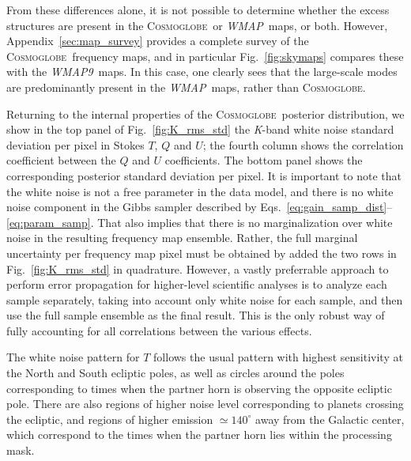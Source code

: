 \documentclass[twocolumn]{../../common/aa}
\def\WMAP{\emph{WMAP}}
\def\WMAPnine{\emph{WMAP9}}
\newcommand{\cosmoglobe}{\textsc{Cosmoglobe}}
\newcommand{\K}[0]{\textit K}
\begin{document}
From these differences alone, it is not possible to determine whether the excess structures are present in the \cosmoglobe\ or \WMAP\ maps, or both. However, Appendix~\ref{sec:map_survey} provides a complete survey of the \cosmoglobe\ frequency maps, and in particular Fig.~\ref{fig:skymaps} compares these with the \WMAPnine\ maps. In this case, one clearly sees that the large-scale modes are predominantly present in the \WMAP\ maps, rather than \cosmoglobe. 

Returning to the internal properties of the \cosmoglobe\ posterior distribution, we show in the top panel of Fig.~\ref{fig:K_rms_std} the \K-band white noise standard deviation per pixel in Stokes $T$, $Q$ and $U$; the fourth column shows the correlation coefficient between the $Q$ and $U$ coefficients. The bottom panel shows the corresponding posterior standard deviation per pixel. It is important to note that the white noise is not a free parameter in the data model, and there is no white noise component in the Gibbs sampler described by Eqs.~\eqref{eq:gain_samp_dist}--\eqref{eq:param_samp}. That also implies that there is no marginalization over white noise in the resulting frequency map ensemble. Rather, the full marginal uncertainty per frequency map pixel must be obtained by added the two rows in Fig.~\ref{fig:K_rms_std} in quadrature. However, a vastly preferrable approach to perform error propagation for higher-level scientific analyses is to analyze each sample separately, taking into account only white noise for each sample, and then use the full sample ensemble as the final result. This is the only robust way of fully accounting for all correlations between the various effects.  

The white noise pattern for $T$ follows the usual pattern with highest sensitivity at the North and South ecliptic poles, as well as circles around the poles corresponding to times when the partner horn is observing the opposite ecliptic pole. There are also regions of higher noise level corresponding to planets crossing the ecliptic, and regions of higher emission $\simeq140^\circ$ away from the Galactic center, which correspond to the times when the partner horn lies within the processing mask.
\end{document}
